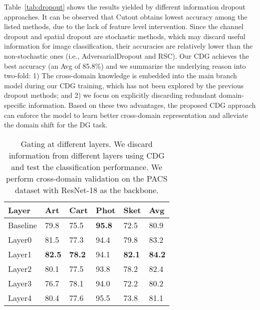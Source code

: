 Table~\ref{tab:dropout} shows the results yielded by different information dropout approaches. It can be observed that Cutout \citep{devries2017improved} obtains lowest accuracy among the listed methods, due to the lack of feature level intervention. Since the channel dropout and spatial dropout are stochastic methods, which may discard useful information for image classification, their accuracies are relatively lower than the non-stochastic ones (i.e., AdversarialDropout and RSC). Our CDG achieves the best accuracy (an Avg of 85.8\%) and we summarize the underlying reason into two-fold: 1) The cross-domain knowledge is embedded into the main branch model during our CDG training, which has not been explored by the previous dropout methods; and 2) we focus on explicitly discarding redundant domain-specific information. Based on these two advantages, the proposed CDG approach can enforce the model to learn better cross-domain representation and alleviate the domain shift for the DG task.


\begin{table}[tb]
  \caption{Gating at different layers. We discard information from different layers using CDG and test the classification performance. We perform cross-domain validation on the PACS dataset with ResNet-18 as the backbone.}
  \label{tab:layers}
  \begin{center}
    \begin{tabularx}{0.5\textwidth}{p{}<{\centering}|X<{\centering}|X<{\centering}|X<{\centering}|X<{\centering}|X<{\centering}}
      \toprule[0.6pt]
      Layer & Art & Cart & Phot & Sket & Avg           \\
      \midrule[0.4pt]

      Baseline     & 79.8       & 75.5             & \textbf{95.8}   & 72.5            & 80.9          \\
      Layer0       & 81.5       & 77.3             & 94.4            & 79.8            & 83.2          \\
      Layer1       & \textbf{82.5}  & \textbf{78.2}  & 94.1          & \textbf{82.1}   & \textbf{84.2} \\
      Layer2       & 80.1       & 77.5             & 93.8            & 78.2            & 82.4          \\
      Layer3       & 76.7       & 78.1             & 94.0            & 72.2            & 80.2          \\
      Layer4       & 80.4       & 77.6             & 95.5            & 73.8            & 81.1          \\

      \bottomrule[0.6pt]
    \end{tabularx}
  \end{center}
\end{table}


